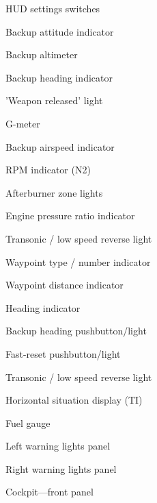 \documentclass[a4paper]{report}
\begin{document}
\begin{figure}
\begin{multicols}{2}
\begin{enumerate}[nosep]
{      \item HUD settings switches
      \item Backup attitude indicator
      \item Backup altimeter
      \item Backup heading indicator
      \item 'Weapon released' light
      \item G-meter
      \item Backup airspeed indicator
      \item RPM indicator (N2)
      \item Afterburner zone lights
      \item Engine pressure ratio indicator
      \item Transonic / low speed reverse light
      \item Waypoint type / number indicator
      \item Waypoint distance indicator
    }{
      \item Heading indicator
      \item Backup heading pushbutton/light
      \item Fast-reset pushbutton/light
      \item Transonic / low speed reverse light
      \item Horizontal situation display (TI)
    }
      \item Fuel gauge
      \item Left warning lights panel
      \item Right warning lights panel
    \end{enumerate}
  \end{multicols}

  \caption{Cockpit---front panel}
  \label{fig:front-panel}
\end{figure}
\end{document}
